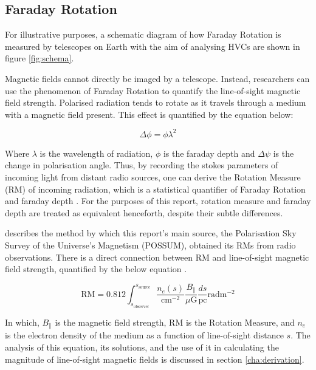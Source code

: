 \subsection{Faraday Rotation}
\label{ssec:faraday}

For illustrative purposes, a schematic diagram of how Faraday Rotation is measured by telescopes on Earth with the aim of analysing HVCs are shown in figure \ref{fig:schema}.

Magnetic fields cannot directly be imaged by a telescope. Instead, researchers can use the phenomenon of Faraday Rotation to quantify the line-of-sight magnetic field strength. Polarised radiation tends to rotate as it travels through a medium with a magnetic field present. This effect is quantified by the equation below:

\begin{equation}
    \Delta\phi = \phi\lambda^2
    \label{eq:stokes}
\end{equation}


Where $\lambda$ is the wavelength of radiation, $\phi$ is the faraday depth and $\Delta\psi$ is the change in polarisation angle. Thus, by recording the stokes parameters of incoming light from distant radio sources, one can derive the Rotation Measure (RM) of incoming radiation, which is a statistical quantifier of Faraday Rotation and faraday depth \citep{ID1, ID14}. For the purposes of this report, rotation measure and faraday depth are treated as equivalent henceforth, despite their subtle differences.


\cite{ID1} describes the method by which this report's main source, the Polarisation Sky Survey of the Universe's Magnetism (POSSUM), obtained its RMs from radio observations. There is a direct connection between RM and line-of-sight magnetic field strength, quantified by the below equation \citep{ID5, ID1, ID26, ID27, ID30}.


\begin{equation}
    \mathrm{RM} = 0.812 \int_{s_{\mathrm{observer}}}^{s_{\mathrm{source}}}{\frac{n_e(s)}{\mathrm{cm^{-2}}}\frac{B_{\parallel}}{\mu\mathrm{G}}\frac{ds}{\mathrm{pc}}} \mathrm{rad m^{-2}}
    \label{eq:rm_integral}
\end{equation}


In which, $B_{\parallel}$ is the magnetic field strength, $\mathrm{RM}$ is the Rotation Measure, and $n_e$ is the electron density of the medium as a function of line-of-sight distance $s$. The analysis of this equation, its solutions, and the use of it in calculating the magnitude of line-of-sight magnetic fields is discussed in section \ref{cha:derivation}.


